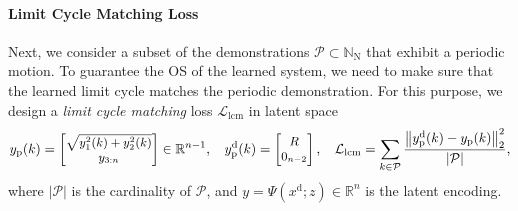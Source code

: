 \paragraph{Limit Cycle Matching Loss}
Next, we consider a subset of the demonstrations $\mathcal{P} \subset \mathbb{N}_\mathrm{N}$ that exhibit a periodic motion. To guarantee the OS of the learned system, we need to make sure that the learned limit cycle matches the periodic demonstration.
For this purpose, we design a \emph{limit cycle matching} loss $\mathcal{L}_\mathrm{lcm}$ in latent space
\begin{equation}\small
    y_\mathrm{p}(k) = \begin{bmatrix}
        \sqrt{y_1^2(k) + y_2^2(k)}\\ y_{3:n}
    \end{bmatrix} \in \mathbb{R}^{n-1},
    \quad
    y_\mathrm{p}^\mathrm{d}(k) = \begin{bmatrix}
        R\\ 0_{n-2}
    \end{bmatrix},
    \quad
    \mathcal{L}_\mathrm{lcm} = \sum_{k \in \mathcal{P}} \frac{\big \lVert y_\mathrm{p}^\mathrm{d}(k) - y_\mathrm{p}(k) \big \rVert_2^2}{|\mathcal{P}|},
\end{equation}
where $|\mathcal{P}|$ is the cardinality of $\mathcal{P}$, and $y=\Psi(x^\mathrm{d}; z) \in \mathbb{R}^n$ is the latent encoding. %

